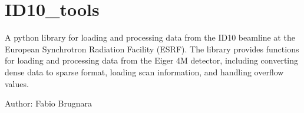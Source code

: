 \documentclass[letterpaper,10pt,english]{sphinxmanual}
\begin{document}

\begin{fulllineitems}
\label{\detokenize{index:XPCS_tools.theta2Q}}
\pysigstartsignatures
\pysiglinewithargsret
{}
{\sphinxparamcomma {}}
{}
\pysigstopsignatures
\end{fulllineitems}


\chapter{ID10\_tools}
\label{\detokenize{index:module-ID10_tools}}\label{\detokenize{index:id10-tools}}
\sphinxAtStartPar
A python library for loading and processing data from the ID10 beamline at the European Synchrotron Radiation Facility (ESRF). The library provides functions for loading and processing data from the Eiger 4M detector, including converting dense data to sparse format, loading scan information, and handling overflow values.

\sphinxAtStartPar
Author: Fabio Brugnara
\end{document}

